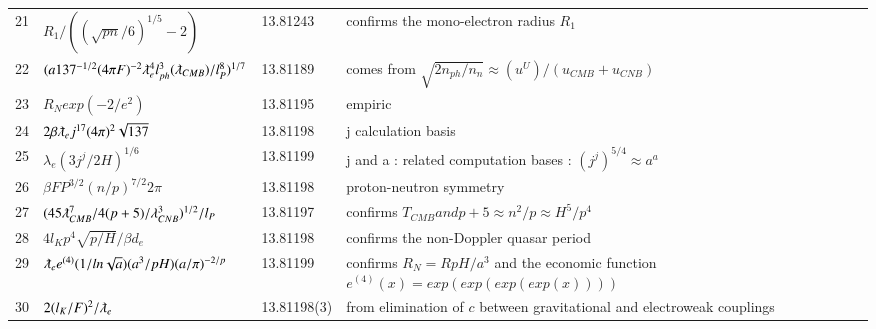 \documentclass[a4paper,9pt]{article}
\begin{document}
\begin{table}
\begin{tabular}{llll}
   
   21 & $R_1/((\sqrt{pn}/6)^{1/5}-2)$ & 13.81243 & confirms the mono-electron radius $R_1$\\
   
   
   22 & $(a 137^{-1/2}(4\pi F)^{-2} \lambdabar_{e}^4 l_{ph}^3 (\lambdabar_{CMB})/l_P^8)^{1/7}$ & 13.81189 & comes from $\sqrt{2n_{ph}/n_n} \approx (u^U)/(u_{CMB}+u_{CNB})$\\
   23 & $R_N exp(-2/e^2)$ & 13.81195 & empiric\\ 
  24 & $2\beta \lambdabar_{e} j^{17} (4\pi)^2 \sqrt{137}$ & 13.81198 & j calculation basis \\
   25 & $\lambda_{e} (3j^j/2H)^{1/6}$ & 13.81199 & j and a : related computation bases : $(j^j)^{5/4} \approx a^a$\\
   26 & $\beta F P^{3/2} (n/p)^{7/2} 2 \pi$ & 13.81198 & proton-neutron symmetry  \\ 
   27 & $(45\lambdabar_{CMB}^7/4(p+5)/\lambda_{CNB}^3)^{1/2}/l_P$ & 13.81197 & confirms $T_{CMB} and p+5 \approx n^2/p \approx H^5/p^4$\\
   28 & $4l_Kp^4 \sqrt{p/H}/\beta d_e$ & 13.81198 & confirms the non-Doppler quasar period \\
   29 & $\lambdabar_{e} e^{(4)}(1/ln{\sqrt a}) (a^3/pH) (a/\pi)^{-2/p}   $ & 13.81199 & confirms $R_N = R pH/a^3$ and the economic function $e^{(4)}(x)= exp(exp(exp(exp(x))))$\\ 
   30 & $2(l_K/F)^2/\lambdabar_{e}$ & 13.81198(3) & from elimination of $c$ between gravitational and electroweak couplings \\
  
  
    \bottomrule
  \end{tabular}
\end{table}
\end{document}
